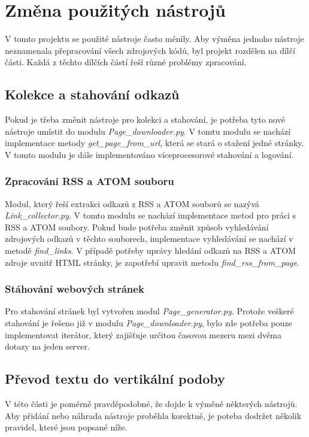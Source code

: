 \section{Změna použitých nástrojů}
V tomto projektu se použité nástroje často měnily. Aby výměna jednoho nástroje neznamenala
přepracování všech zdrojových kódů, byl projekt rozdělen na dílčí části. Každá z těchto
dílčích částí řeší různé problémy zpracování.

\subsection{Kolekce a stahování odkazů}
Pokud je třeba změnit nástroje pro kolekci a stahování, je potřeba tyto nové nástroje
umístit do modulu \textit{Page\_downloader.py}. V tomtu modulu se nachází implementace
metody \textit{get\_page\_from\_url}, která se stará o stažení jedné stránky. V tomto
modulu je dále implementováno víceprocesorové stahování a logování.

\subsubsection{Zpracování RSS a ATOM souboru}
Modul, který řeší extrakci odkazů z RSS a ATOM souborů se nazývá \textit{Link\_collector.py}.
V tomto modulu se nachází implementace metod pro práci s RSS a ATOM soubory. Pokud bude
potřeba změnit způsob vyhledávání zdrojových odkazů v těchto souborech, implementace vyhledávání
se nachází v metodě \textit{find\_links}. V případě potřeby uprávy hledání odkazů
na RSS a ATOM zdroje uvnitř HTML stránky, je zapotřebí upravit metodu \textit{find\_rss\_from\_page}.

\subsubsection{Stáhování webových stránek}
Pro stahování stránek byl vytvořen modul \textit{Page\_generator.py}. Protože veškeré
stahování je řešeno již v modulu \textit{Page\_downloader.py}, bylo zde potřeba pouze implementovat
iterátor, který zajišťuje určitou časovou mezeru mezi dvěma dotazy na jeden server.

\subsection{Převod textu do vertikální podoby}
V této části je poměrně pravděpodobné, že dojde k výměně některých nástrojů.
Aby přidání nebo náhrada nástroje proběhla korektně, je poteba dodržet několik
pravidel, které jsou popsané níže.

